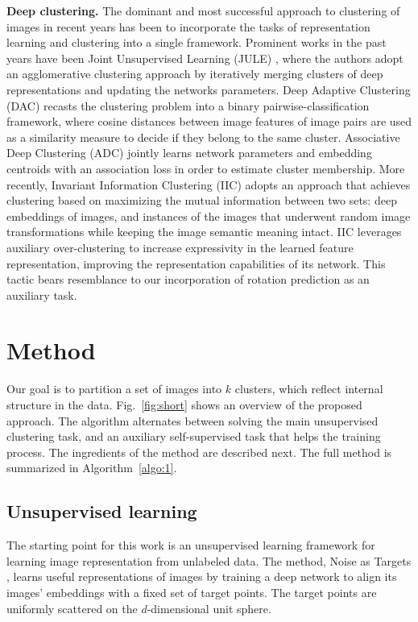 \documentclass[a4paper,conference]{IEEEtran}
\begin{document}
\textbf{Deep clustering.} The dominant and most successful approach to clustering of images in recent years has been to incorporate the tasks of representation learning and clustering into a single framework. Prominent works in the past years have been Joint Unsupervised Learning (JULE) \cite{yangCVPR2016joint}, where the authors adopt an agglomerative clustering approach by iteratively merging clusters of deep representations and updating the networks parameters. Deep Adaptive Clustering (DAC) \cite{Chang2017DeepAI} recasts the clustering problem into a binary pairwise-classification framework, where cosine distances between image features of image pairs are used as a similarity measure to decide if they belong to the same cluster. Associative Deep Clustering (ADC) \cite{Husser2017AssociativeDC} jointly learns network parameters and embedding centroids with an association loss in order to estimate cluster membership. More recently, Invariant Information Clustering (IIC) \cite{iic} adopts an approach that achieves clustering based on maximizing the mutual information between two sets: deep embeddings of images, and instances of the images that underwent  random image transformations while keeping the image semantic meaning intact. IIC leverages auxiliary over-clustering to increase expressivity in the learned feature representation, improving the representation capabilities of its network. This tactic bears resemblance to our incorporation of rotation prediction as an auxiliary task.

\section{Method}
\label{sec:method}

Our goal is to partition a set of images into $k$ clusters, which reflect internal structure in the data. Fig.~\ref{fig:short} shows an overview of the proposed approach. The algorithm alternates between solving the main unsupervised clustering task, and an auxiliary self-supervised task that helps the training process. The ingredients of the method are described next. The full method is summarized in Algorithm~\ref{algo:1}.

\subsection{Unsupervised learning}

The starting point for this work is an unsupervised learning framework for learning image representation from unlabeled data. The method, Noise as Targets \cite{BJ2017}, learns useful representations of images by training a deep network to align its images' embeddings with a fixed set of target points. The target points are uniformly scattered on the $d$-dimensional unit sphere. 
\end{document}

